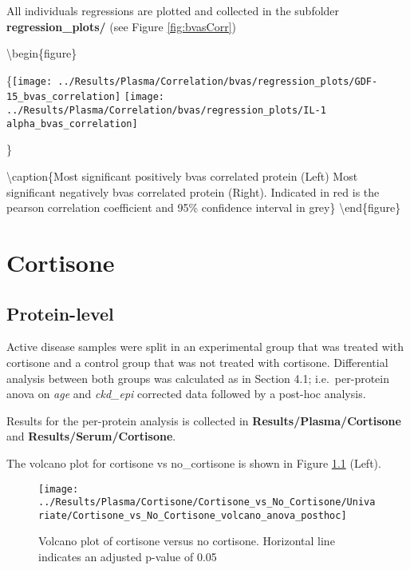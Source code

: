 \documentclass[
]{book}
\begin{document}
All individuals regressions are plotted and collected in the subfolder \textbf{regression\_plots/} (see Figure \ref{fig:bvasCorr})

\textbackslash begin\{figure\}

\{\centering \texttt{[image: ../Results/Plasma/Correlation/bvas/regression\_plots/GDF-15\_bvas\_correlation]} \texttt{[image: ../Results/Plasma/Correlation/bvas/regression\_plots/IL-1 alpha\_bvas\_correlation]}

\}

\textbackslash caption\{Most significant positively bvas correlated protein (Left) Most significant negatively bvas correlated protein (Right). Indicated in red is the pearson correlation coefficient and 95\% confidence interval in grey\}\label{fig:bvasCorr}
\textbackslash end\{figure\}

\hypertarget{cortisone}{%
\chapter{Cortisone}\label{cortisone}}

\hypertarget{protein-level-1}{%
\section{Protein-level}\label{protein-level-1}}

Active disease samples were split in an experimental group that was treated with cortisone and a control group that was not treated with cortisone. Differential analysis between both groups was calculated as in Section 4.1; i.e.~per-protein anova on \emph{age} and \emph{ckd\_epi} corrected data followed by a post-hoc analysis.

Results for the per-protein analysis is collected in \textbf{Results/Plasma/Cortisone} and \textbf{Results/Serum/Cortisone}.

The volcano plot for cortisone vs no\_cortisone is shown in Figure \ref{fig:cortplots} (Left).

\begin{figure}

{\centering \texttt{[image: ../Results/Plasma/Cortisone/Cortisone\_vs\_No\_Cortisone/Univariate/Cortisone\_vs\_No\_Cortisone\_volcano\_anova\_posthoc]} 

}

\caption{Volcano plot of cortisone versus no cortisone. Horizontal line indicates an adjusted p-value of 0.05}\label{fig:cortplots}
\end{figure}
\end{document}
